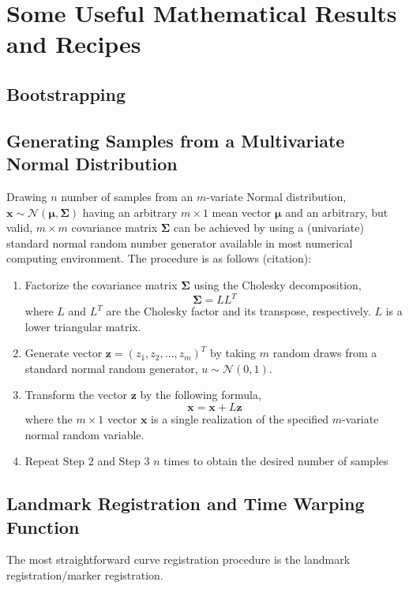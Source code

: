 \chapter{Some Useful Mathematical Results and Recipes}\label{app:math_results}

\section{Bootstrapping}\label{app:bootstrapping}

\section{Generating Samples from a Multivariate Normal Distribution}

Drawing $n$ number of samples from an $m$-variate Normal distribution, $\boldsymbol{x} \sim \mathcal{N}(\boldsymbol{\mu}, \boldsymbol{\Sigma})$ having an arbitrary $m \times 1$ mean vector $\boldsymbol{\mu}$ and an arbitrary, but valid, $m \times m$ covariance matrix $\boldsymbol{\Sigma}$ can be achieved by using a (univariate) standard normal random number generator available in most numerical computing environment.
The procedure is as follows (citation):

\begin{enumerate}
	\item Factorize the covariance matrix $\boldsymbol{\Sigma}$ using the Cholesky decomposition,
	\begin{equation}
	\boldsymbol{\Sigma} = L L^T
	\end{equation}
	where $L$ and $L^T$ are the Cholesky factor and its transpose, respectively. $L$ is a lower triangular matrix.
	
	\item Generate vector $\mathbf{z}=(z_1, z_2, \dots, z_m)^T$ by taking $m$ random draws from a standard normal random generator, $u \sim \mathcal{N}(0, 1)$.
	
	\item Transform the vector $\mathbf{z}$ by the following formula,
	\begin{equation}
	\mathbf{x} = \boldsymbol{x} + L \boldsymbol{z}
	\end{equation}
	where the $m \times 1$ vector $\mathbf{x}$ is a single realization of the specified $m$-variate normal random variable.
	
	\item Repeat Step $2$ and Step $3$ $n$ times to obtain the desired number of samples 
\end{enumerate}

\section{Landmark Registration and Time Warping Function}\label{app:landmark}

The most straightforward curve registration procedure is the landmark registration/marker registration.